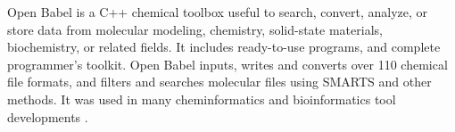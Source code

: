 Open Babel is a C++ chemical toolbox useful to search, convert, analyze, or store data from molecular modeling, chemistry, solid-state materials, biochemistry, or related fields. It includes ready-to-use programs, and complete programmer's toolkit. Open Babel inputs, writes and converts over 110 chemical file formats, and filters and searches molecular files using SMARTS and other methods. It was used in many cheminformatics and bioinformatics tool developments \cite{O_Boyle_2011}.